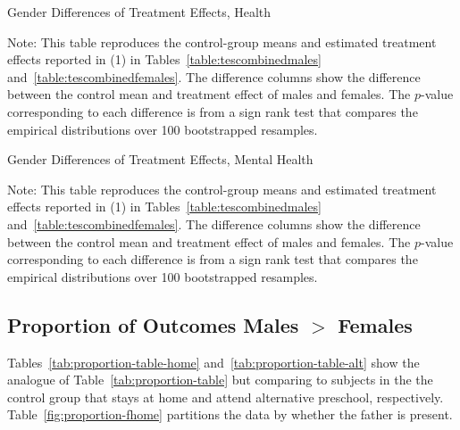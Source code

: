 \begin{table}[!htbp]
\centering
\begin{threeparttable}
\caption{Gender Differences of Treatment Effects, Health}
\begin{scriptsize}

\end{scriptsize}
\begin{tablenotes}
\scriptsize
Note: This table reproduces the control-group means and estimated treatment effects reported in (1) in Tables~\ref{table:tescombinedmales} and~\ref{table:tescombinedfemales}. The difference columns show the difference between the control mean and treatment effect of males and females. The $p$-value corresponding to each difference is from a sign rank test that compares the empirical distributions over 100 bootstrapped resamples.
\end{tablenotes}
\end{threeparttable}
\end{table}

\begin{table}[!htbp]
\centering
\begin{threeparttable}
\caption{Gender Differences of Treatment Effects, Mental Health}
\begin{scriptsize}

\end{scriptsize}
\begin{tablenotes}
\scriptsize
Note: This table reproduces the control-group means and estimated treatment effects reported in (1) in Tables~\ref{table:tescombinedmales} and~\ref{table:tescombinedfemales}. The difference columns show the difference between the control mean and treatment effect of males and females. The $p$-value corresponding to each difference is from a sign rank test that compares the empirical distributions over 100 bootstrapped resamples.
\end{tablenotes}
\end{threeparttable}
\end{table}

\subsection{Proportion of Outcomes Males $>$ Females}
\label{appendix:propmales-females}

Tables~\ref{tab:proportion-table-home} and~\ref{tab:proportion-table-alt} show the analogue of Table~\ref{tab:proportion-table} but comparing to subjects in the the control group that stays at home and attend alternative preschool, respectively. Table~\ref{fig:proportion-fhome} partitions the data by whether the father is present.


